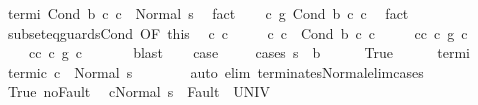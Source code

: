 \begin{isabellebody}
\ termi{\isacharcolon}\ {\isachardoublequoteopen}{\isasymGamma}{\isasymturnstile}Cond\ b\ c{}{\isacharprime}\ c{}{\isacharprime}\ {\isasymdown}\ Normal\ s{\isachardoublequoteclose}\ \isamarkupfalse%
\ fact\isanewline
\ \ \isamarkupfalse%
\ {\isachardoublequoteopen}c\ {\isasymsubseteq}\isactrlsub g\ Cond\ b\ c{}{\isacharprime}\ c{}{\isacharprime}{\isachardoublequoteclose}\ \isamarkupfalse%
\ fact\isanewline
\ \ \isamarkupfalse%
\ subseteq{\isacharunderscore}guards{\isacharunderscore}Cond\ {\isacharbrackleft}OF\ this{\isacharbrackright}\ \isamarkupfalse%
\ c{}\ c{}\ \isanewline
\ \ \ \ c{\isacharcolon}\ {\isachardoublequoteopen}c\ {\isacharequal}\ Cond\ b\ c{}\ c{}{\isachardoublequoteclose}\ \isanewline
\ \ \ \ c{}{\isacharunderscore}c{}{\isacharprime}{\isacharcolon}\ {\isachardoublequoteopen}c{}\ {\isasymsubseteq}\isactrlsub g\ c{}{\isacharprime}{\isachardoublequoteclose}\ \isanewline
\ \ \ \ c{}{\isacharunderscore}c{}{\isacharprime}{\isacharcolon}\ {\isachardoublequoteopen}c{}\ {\isasymsubseteq}\isactrlsub g\ c{}{\isacharprime}{\isachardoublequoteclose}\ \isanewline
\ \ \ \ \isamarkupfalse%
\ blast\isanewline
\ \ \isamarkupfalse%
\ {\isacharquery}case\ \isanewline
\ \ \isamarkupfalse%
\ {\isacharparenleft}cases\ {\isachardoublequoteopen}s\ {\isasymin}\ b{\isachardoublequoteclose}{\isacharparenright}\isanewline
\ \ \ \ \isamarkupfalse%
\ True\isanewline
\ \ \ \ \isamarkupfalse%
\ termi\ \isamarkupfalse%
\ termi{\isacharunderscore}c{}{\isacharprime}{\isacharcolon}\ {\isachardoublequoteopen}{\isasymGamma}{\isasymturnstile}c{}{\isacharprime}\ {\isasymdown}\ Normal\ s{\isachardoublequoteclose}\isanewline
\ \ \ \ \ \ \isamarkupfalse%
\ {\isacharparenleft}auto\ elim{\isacharcolon}\ terminates{\isacharunderscore}Normal{\isacharunderscore}elim{\isacharunderscore}cases{\isacharparenright}\isanewline
\ \ \ \ \isamarkupfalse%
\ True\ noFault\ \isamarkupfalse%
\ {\isachardoublequoteopen}{\isasymGamma}{\isasymturnstile}{\isasymlangle}c{}{\isacharprime}{\isacharcomma}Normal\ s\ {\isasymrangle}\ {\isasymRightarrow}{\isasymnotin}Fault\ {\isacharbackquote}\ UNIV{\isachardoublequoteclose}\isanewline

\end{isabellebody}
